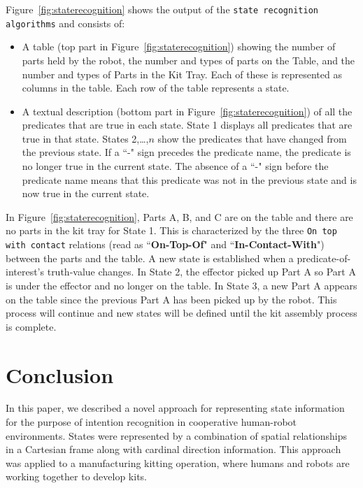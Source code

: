 \documentclass[preprint,12pt]{elsarticle}
\begin{document}
Figure~\ref{fig:staterecognition} shows the output of the \texttt{state recognition algorithms} and consists of:
\begin{itemize}
 \item A table (top part in Figure~\ref{fig:staterecognition}) showing the number of parts held by the robot, the number and types of parts on the Table, and the number and types of Parts in the Kit Tray. Each of these is represented as columns in the table. Each row of the table represents a state.
 \item A textual description (bottom part in Figure~\ref{fig:staterecognition}) of all the predicates that are true in each state. State 1 displays all predicates that are true in that state. States 2,\ldots,$n$ show the predicates that have changed from the previous state. If a ``-" sign precedes the predicate name, the predicate is no longer true in the current state. The absence of a ``-" sign before the predicate name means that this predicate was not in the previous state and is now true in the current state.
\end{itemize}

In Figure~\ref{fig:staterecognition}, Parts A, B, and C are on the table and there are no parts in the kit tray for State 1. This is characterized by the three \texttt{On top with contact} relations (read as ``\textbf{On-Top-Of}" and ``\textbf{In-Contact-With}") between the parts and the table. A new state is established when a predicate-of-interest's truth-value changes. In State 2, the effector picked up Part A so Part A is under the effector and no longer on the table. In State 3, a new Part A appears on the table since the previous Part A has been picked up by the robot. This process will continue and new states will be defined until the kit assembly process is complete.



\section{Conclusion}\label{S:section6}
In this paper, we described a novel approach for representing state information for the purpose of intention recognition in cooperative human-robot environments. States were represented by a combination of spatial relationships in a Cartesian frame along with cardinal direction information. This approach was applied to a manufacturing kitting operation, where humans and robots are working together to develop kits.
\end{document}

